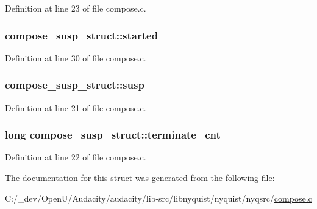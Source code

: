 Definition at line 23 of file compose.\+c.

\subsubsection[{\texorpdfstring{started}{started}}]{ compose\+\_\+susp\+\_\+struct\+::started}\hypertarget{structcompose__susp__struct_adaeb2fca5a7b2c757364d9ded00af62f}{}\label{structcompose__susp__struct_adaeb2fca5a7b2c757364d9ded00af62f}


Definition at line 30 of file compose.\+c.

\subsubsection[{\texorpdfstring{susp}{susp}}]{ compose\+\_\+susp\+\_\+struct\+::susp}\hypertarget{structcompose__susp__struct_acd80b164892451dfe664760467629910}{}\label{structcompose__susp__struct_acd80b164892451dfe664760467629910}


Definition at line 21 of file compose.\+c.

\subsubsection[{\texorpdfstring{terminate\+\_\+cnt}{terminate_cnt}}]{\setlength{\rightskip}{0pt plus 5cm}long compose\+\_\+susp\+\_\+struct\+::terminate\+\_\+cnt}\hypertarget{structcompose__susp__struct_adde8df62bcfa3ef4f54e09e0dd72a323}{}\label{structcompose__susp__struct_adde8df62bcfa3ef4f54e09e0dd72a323}


Definition at line 22 of file compose.\+c.



The documentation for this struct was generated from the following file\+:\begin{DoxyCompactItemize}
\item 
C\+:/\+\_\+dev/\+Open\+U/\+Audacity/audacity/lib-\/src/libnyquist/nyquist/nyqsrc/\hyperlink{compose_8c}{compose.\+c}\end{DoxyCompactItemize}
